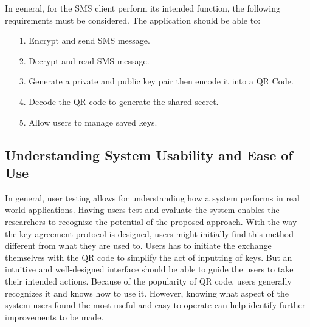 \documentclass[journal]{./IEEE/IEEEtran}
\begin{document}
In general, for the SMS client perform its intended function, the following
requirements must be considered. The application should be able to:
\begin{itemize}
	\item[1.] Encrypt and send SMS message.
	\item[2.] Decrypt and read SMS message.
	\item[3.] Generate a private and public key pair then encode it into a
		QR Code.
	\item[4.] Decode the QR code to generate the shared secret.
	\item[5.] Allow users to manage saved keys.
\end{itemize}

\subsection{Understanding System Usability and Ease of Use}
In general, user testing allows for understanding how a system performs in
real world applications. Having users test and evaluate the system enables
the researchers to recognize the potential of the proposed approach.
With the way the key-agreement protocol is designed, users might initially
find this method different from what they are used to. Users has to initiate
the exchange themselves with the QR code to simplify the act of inputting of
keys. But an intuitive and well-designed interface should be able to guide
the users to take their intended actions. Because of the popularity of QR code,
users generally recognizes it and knows how to use it. However, knowing what
aspect of the system users found the most useful and
easy to operate can help identify further improvements to be made.


%





\end{document}
